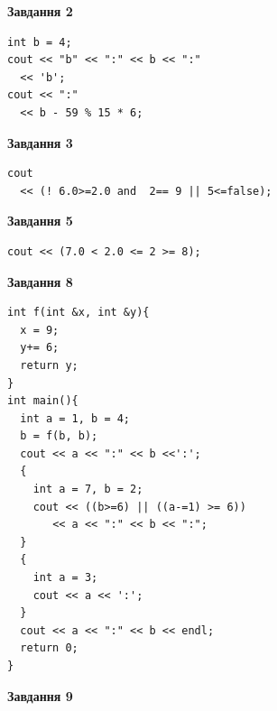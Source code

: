 \documentclass[12pt, ukrainian]{article}
\begin{document}
{\begin {large}
\begin{minipage}[t]{7.0cm}
\end{minipage}
\vline \hspace{1mm}
\begin{minipage}[t]{11.0cm}

\begin{center}
\textbf{Завдання 2}
\end{center}
\vspace{-8mm}

\begin{verbatim}
int b = 4;
cout << "b" << ":" << b << ":" 
  << 'b';
cout << ":" 
  << b - 59 % 15 * 6;
\end{verbatim}



\begin{center}
\textbf{Завдання 3}
\end{center}
\vspace{-8mm}

\begin{verbatim}
cout 
  << (! 6.0>=2.0 and  2== 9 || 5<=false);
\end{verbatim}



\begin{center}
\textbf{Завдання 5}
\end{center}
\vspace{-8mm}

\begin{verbatim}
cout << (7.0 < 2.0 <= 2 >= 8);
\end{verbatim}



\begin{center}
\textbf{Завдання 8}
\end{center}
\vspace{-8mm}

\begin{verbatim}
int f(int &x, int &y){
  x = 9;
  y+= 6;
  return y;
}
int main(){
  int a = 1, b = 4;
  b = f(b, b);
  cout << a << ":" << b <<':';
  {
    int a = 7, b = 2;
    cout << ((b>=6) || ((a-=1) >= 6))
       << a << ":" << b << ":";
  }
  {
    int a = 3;
    cout << a << ':';
  }
  cout << a << ":" << b << endl;
  return 0;
}
\end{verbatim}

\end{minipage}


\begin{minipage}[t]{7.0cm}

\begin{center}
\textbf{Завдання 9}
\end{center}
\vspace{-8mm}


\end{minipage}
\end{large}}
\end{document}
